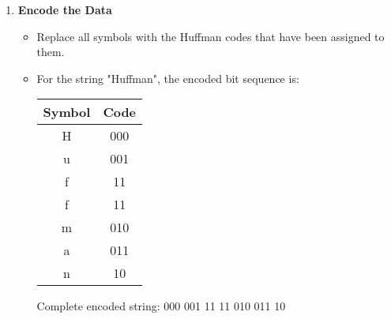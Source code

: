 \begin{enumerate}[label=\textbf{\Alph*.}]
    \item \textbf{Encode the Data}  
    \begin{itemize}  
        \item Replace all symbols with the Huffman codes that have been assigned to them.  
        \item For the string "Huffman", the encoded bit sequence is:  
        \begin{center}  
        \begin{tabular}{|c|c|}  
        \hline  
        \rowcolor{gray!30}
        Symbol & Code \\
        \hline  
        H & 000 \\
        u & 001 \\
        f & 11 \\
        f & 11 \\
        m & 010 \\
        a & 011 \\
        n & 10 \\
        \hline  
        \end{tabular}  
        \end{center}  
        
        \begin{center}  
        Complete encoded string: 000 001 11 11 010 011 10  
        \end{center}  
    \end{itemize}  


\end{enumerate}
